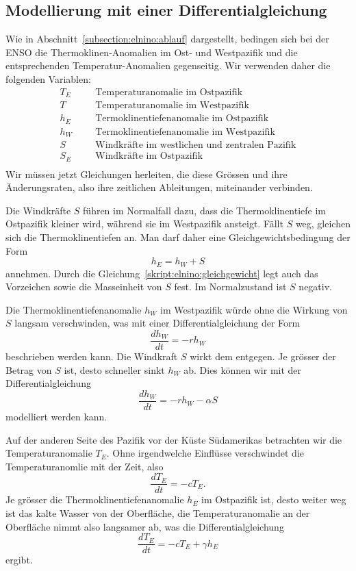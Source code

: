\subsection{Modellierung mit einer Differentialgleichung%
\label{subsection:elnino:modellierung}}
Wie in Abschnitt~\ref{subsection:elnino:ablauf} dargestellt, bedingen sich
bei der ENSO die Thermoklinen-Anomalien im Ost- und Westpazifik und die
entsprechenden Temperatur-Anomalien gegenseitig.
Wir verwenden daher die folgenden Variablen:
\[
\begin{aligned}
T_E&&&\text{Temperaturanomalie im Ostpazifik}\\
T&&&\text{Temperaturanomalie im Westpazifik}\\
h_E&&&\text{Termoklinentiefenanomalie im Ostpazifik}\\
h_W&&&\text{Termoklinentiefenanomalie im Westpazifik}\\
S&&&\text{Windkräfte im westlichen und zentralen Pazifik}\\
S_E&&&\text{Windkräfte im Ostpazifik}\\
\end{aligned}
\]
Wir müssen jetzt Gleichungen herleiten, die diese Grössen und ihre
Änderungsraten, also ihre zeitlichen Ableitungen, miteinander verbinden.

Die Windkräfte $S$ führen im Normalfall dazu, dass die Thermoklinentiefe
im Ostpazifik kleiner wird, während sie im Westpazifik ansteigt.
Fällt $S$ weg, gleichen sich die Thermoklinentiefen an.
Man darf daher eine Gleichgewichtsbedingung der Form
\begin{equation}
h_E = h_W + S
\label{skript:elnino:gleichgewicht}
\end{equation}
annehmen.
Durch die Gleichung~\ref{skript:elnino:gleichgewicht} legt auch
das Vorzeichen sowie die Masseinheit von $S$ fest.
Im Normalzustand ist $S$ negativ.

Die Thermoklinentiefenanomalie $h_W$ im Westpazifik würde ohne die Wirkung
von $S$ langsam verschwinden, was mit einer Differentialgleichung
der Form
\[
\frac{dh_W}{dt} = -rh_W
\]
beschrieben werden kann.
Die Windkraft $S$ wirkt dem entgegen.
Je grösser der Betrag von $S$ ist, desto schneller sinkt $h_W$ ab.
Dies können wir mit der Differentialgleichung
\begin{equation}
\frac{dh_W}{dt}
=
-rh_W -\alpha S
\end{equation}
modelliert werden kann.

Auf der anderen Seite des Pazifik vor der Küste Südamerikas
betrachten wir die Temperaturanomalie
$T_E$.
Ohne irgendwelche Einflüsse verschwindet die Temperaturanomlie mit der
Zeit, also
\[
\frac{dT_E}{dt} = -cT_E.
\]
Je grösser die Thermoklinentiefenanomalie $h_E$ im Ostpazifik ist, desto weiter
weg ist das kalte Wasser von der Oberfläche, die Temperaturanomalie an
der Oberfläche nimmt also langsamer ab, was die Differentialgleichung
\begin{equation}
\frac{dT_E}{dt} = -cT_E + \gamma h_E
\end{equation}
ergibt.

